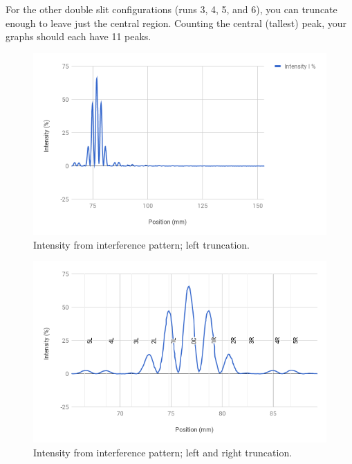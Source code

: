 For the other double slit configurations (runs 3, 4, 5, and 6), you can truncate enough to leave just the central region. Counting the central (tallest) peak, your graphs should each have 11 peaks.
\begin{figure}[ht!]
	\centering
	\includegraphics[scale=0.77]{images/10-interference/chart2.png}
	\caption{Intensity from interference pattern; left truncation.}
	\label{chart2}
\end{figure}
\begin{figure}[ht!]
	\centering
	\includegraphics[scale=0.77]{images/10-interference/chart3.png}
	\caption{Intensity from interference pattern; left and right truncation.}
	\label{chart3}
\end{figure}
